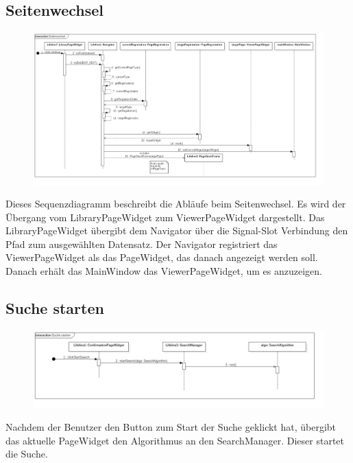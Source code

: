 \subsection{Seitenwechsel}

\begin{figure}[H]
\centering
\includegraphics[width=\linewidth]{img/Sequenzdiagramme/Seitenwechsel}
\label{fig:seitenwechsel}
\end{figure}

Dieses Sequenzdiagramm beschreibt die Abläufe beim Seitenwechsel. Es wird der Übergang vom LibraryPageWidget zum ViewerPageWidget dargestellt. Das LibraryPageWidget übergibt dem Navigator über die Signal-Slot Verbindung den Pfad zum ausgewählten Datensatz. Der Navigator registriert das ViewerPageWidget als das PageWidget, das danach angezeigt werden soll. Danach erhält das MainWindow das ViewerPageWidget, um es anzuzeigen.

\subsection{Suche starten}

\begin{figure}[H]
\centering
\includegraphics[width=\linewidth]{img/Sequenzdiagramme/SucheStarten}
\label{fig:sucheStarten}
\end{figure}
Nachdem der Benutzer den Button zum Start der Suche geklickt hat, übergibt das aktuelle PageWidget den Algorithmus an den SearchManager. Dieser startet die Suche.

